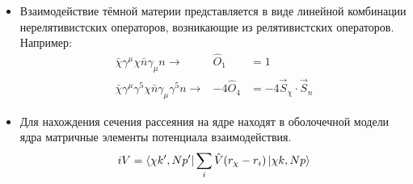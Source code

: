 \begin{itemize}
	\item Взаимодействие тёмной материи представляется в виде линейной комбинации нерелятивистских операторов, возникающие из релятивистских операторов. Например:
	\begin{eqnarray*}
		\bar{\chi}\gamma^{\mu}\chi \bar{n}\gamma_{\mu}n \rightarrow& \hat{O}_1 &= 1 \\
		\bar{\chi}\gamma^{\mu}\gamma^{5}\chi \bar{n}\gamma_{\mu}\gamma^{5}n \rightarrow& -4\hat{O}_4  &= -4 \vec{S}_{\chi}\cdot\vec{S}_{n}
	\end{eqnarray*}
	\item Для нахождения сечения рассеяния на ядре находят в оболочечной модели ядра матричные элементы 
	потенциала взаимодействия.
	\begin{equation*}
		iV = \bra{\chi k',N p'} \sum_i{\hat{V}(r_{\chi} - r_{i})} \ket{\chi k,N p}
	\end{equation*}
\end{itemize}